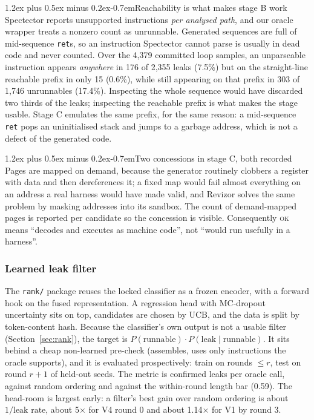 \documentclass[conference]{IEEEtran}
\makeatletter
\renewcommand\paragraph{\@startsection{paragraph}{4}{\z@}%
  {1.2ex plus 0.5ex minus 0.2ex}{-0.7em}{\normalfont\normalsize\bfseries}}
\makeatother
\begin{document}
\paragraph{Reachability is what makes stage B work}
Spectector reports unsupported instructions \emph{per analysed path}, and our
oracle wrapper treats a nonzero count as unrunnable. Generated sequences are
full of mid-sequence \texttt{ret}s, so an instruction Spectector cannot parse
is usually in dead code and never counted. Over the 4,379 committed loop
samples, an unparseable instruction appears \emph{anywhere} in 176 of 2,355
leaks (7.5\%) but on the straight-line reachable prefix in only 15 (0.6\%),
while still appearing on that prefix in 303 of 1,746 unrunnables (17.4\%).
Inspecting the whole sequence would have discarded two thirds of the leaks;
inspecting the reachable prefix is what makes the stage usable. Stage C
emulates the same prefix, for the same reason: a mid-sequence \texttt{ret} pops
an uninitialised stack and jumps to a garbage address, which is not a defect of
the generated code.

\paragraph{Two concessions in stage C, both recorded}
Pages are mapped on demand, because the generator routinely clobbers a register
with data and then dereferences it; a fixed map would fail almost everything on
an address a real harness would have made valid, and Revizor solves the same
problem by masking addresses into its sandbox. The count of demand-mapped pages
is reported per candidate so the concession is visible. Consequently
\textsc{ok} means ``decodes and executes as machine code'', not ``would run
usefully in a harness''.

\subsubsection{Learned leak filter}
\label{sec:rankdesign}
The \texttt{rank/} package reuses the locked classifier as a frozen encoder,
with a forward hook on the fused representation. A regression head with
MC-dropout uncertainty sits on top, candidates are chosen by UCB, and the data
is split by token-content hash. Because the classifier's own output is not a usable filter
(Section~\ref{sec:rank}), the target is
$P(\text{runnable}) \cdot P(\text{leak} \mid \text{runnable})$. It sits behind
a cheap non-learned pre-check (assembles, uses only instructions the oracle
supports), and it is evaluated prospectively: train on rounds $\le r$, test
on round $r{+}1$ of held-out seeds. The metric is confirmed leaks per oracle
call, against random ordering and against the within-round length bar
(0.59). The head-room is largest early: a filter's best gain over random
ordering is about $1/\text{leak rate}$, about 5$\times$ for V4 round 0 and
about 1.14$\times$ for V1 by round 3.
\end{document}
